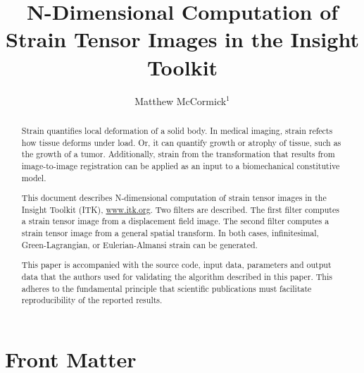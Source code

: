 \documentclass{InsightArticle}
\title{N-Dimensional Computation of Strain Tensor Images in the Insight Toolkit}
\author{Matthew McCormick$^{1}$}
\newcommand{\IJhandlerIDnumber}{1338}
\begin{document}
%
%
\IJhandlefooter{\IJhandlerIDnumber}


\ifpdf
\else
\fi


\maketitle


\ifhtml
\chapter*{Front Matter\label{front}}
\fi


\begin{abstract}
\noindent
Strain quantifies local deformation of a solid body. In medical imaging,
strain refects how tissue deforms under load. Or, it can quantify growth or
atrophy of tissue, such as the growth of a tumor. Additionally, strain from the
transformation that results from image-to-image registration can be applied as
an input to a biomechanical constitutive model.

This document describes N-dimensional computation of strain tensor images in
the Insight Toolkit (ITK), \url{www.itk.org}. Two filters are described. The
first filter computes a strain tensor image from a displacement field image.
The second filter computes a strain tensor image from a general spatial
transform. In both cases, infinitesimal, Green-Lagrangian, or Eulerian-Almansi
strain can be generated.

This paper is accompanied with the source code, input data, parameters and
output data that the authors used for validating the algorithm described in
this paper. This adheres to the fundamental principle that scientific
publications must facilitate reproducibility of the reported results.

\end{abstract}
\end{document}
